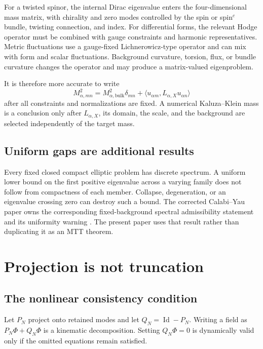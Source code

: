 \documentclass[11pt]{article}
\theoremstyle{definition}
\theoremstyle{remark}
\newcommand{\Id}{\operatorname{Id}}
\begin{document}
For a twisted spinor, the internal Dirac eigenvalue enters the
four-dimensional mass matrix, with chirality and zero modes controlled by
the spin or spin\(^{c}\) bundle, twisting connection, and index.  For
differential forms, the relevant Hodge operator must be combined with gauge
constraints and harmonic representatives.  Metric fluctuations use a
gauge-fixed Lichnerowicz-type operator and can mix with form and scalar
fluctuations.  Background curvature, torsion, flux, or bundle curvature
changes the operator and may produce a matrix-valued eigenproblem.

It is therefore more accurate to write
\[
  M^2_{\alpha,mn}
  =
  M^2_{\alpha,\mathrm{bulk}}\delta_{mn}
  +
  \bigl\langle u_{\alpha m},
  L_{\alpha,X}u_{\alpha n}\bigr\rangle
\]
after all constraints and normalizations are fixed.  A numerical
Kaluza--Klein mass is a conclusion only after \(L_{\alpha,X}\), its domain,
the scale, and the background are selected independently of the target
mass.

\subsection{Uniform gaps are additional results}

Every fixed closed compact elliptic problem has discrete spectrum.  A
uniform lower bound on the first positive eigenvalue across a varying family
does not follow from compactness of each member.  Collapse, degeneration, or
an eigenvalue crossing zero can destroy such a bound.  The corrected
Calabi--Yau paper owns the corresponding fixed-background spectral
admissibility statement and its uniformity warning
\cite{NeroCalabiYau}.  The present paper uses that result rather than
duplicating it as an MTT theorem.

\section{Projection is not truncation}
\label{sec:truncation}

\subsection{The nonlinear consistency condition}

Let \(P_N\) project onto retained modes and let \(Q_N=\Id-P_N\).
Writing a field as \(P_N\Phi+Q_N\Phi\) is a kinematic decomposition.
Setting \(Q_N\Phi=0\) is dynamically valid only if the omitted equations
remain satisfied.
\end{document}
